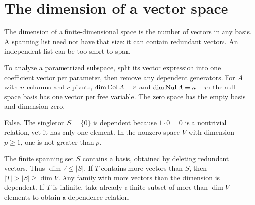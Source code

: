 \section{The dimension of a vector space}
The dimension of a finite-dimensional space is the number of vectors in
any basis. A spanning list need not have that size: it can contain
redundant vectors. An independent list can be too short to span.

To analyze a parametrized subspace, split its vector expression into one
coefficient vector per parameter, then remove any dependent generators.
For $A$ with $n$ columns and $r$ pivots, $\dim\operatorname{Col} A=r$ and
$\dim\operatorname{Nul} A=n-r$: the null-space basis has one vector per free variable.
The zero space has the empty basis and dimension zero.

False. The singleton $S=\{0\}$ is dependent because $1\cdot0=0$
is a nontrivial relation, yet it has only one element. In the nonzero
space $V$ with dimension $p\ge1$, one is not greater than $p$.

The finite spanning set $S$ contains a basis, obtained by deleting
redundant vectors. Thus $\dim V\le |S|$. If $T$ contains more vectors
than $S$, then $|T|>|S|\ge\dim V$. Any family with more vectors than
the dimension is dependent. If $T$ is infinite, take already a finite
subset of more than $\dim V$ elements to obtain a dependence relation.

